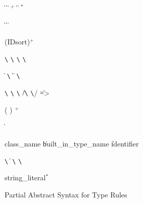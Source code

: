 \begin{BFIGURE}
\begin{grammar}
 \:       
\> \| \>   
\> \| \>   
\> \| \> $^+$ \reserved{(}  \reserved{)}
\> \| \>    
\> \| \> \reserved{(} $^*$ \reserved{)}

 \:  
\> \| \> 
\> \| \>   
\> \| \>   

 \:  (ID\reserved{:}sort)$^+$

 \: \verb|\| \|  \verb|\| \| \verb|\| \|  \verb|\|

 \: \reserved{=} \| \reserved{==} \| \verb|\| \| \reserved{~=} \| \reserved{!=} \| \verb|\|

 \: \verb|\| \| \verb|\| \|\verb|\| \| /\verb|\| \| \verb|\|/ \| =>

 \:  ( \reserved{:}  ) $^+$

 \:  \|   

 \: class\_name \|  built\_in\_type\_name \| identifier

\nonterm{$\diamond$} \: \reserved{\^} \| \verb|\| \|  \| \verb|\| \| \verb|\|

 \: string\_literal$^*$

\end{grammar}
\caption{Partial Abstract Syntax for Type Rules}
\label{fig-abs}
\end{BFIGURE}










